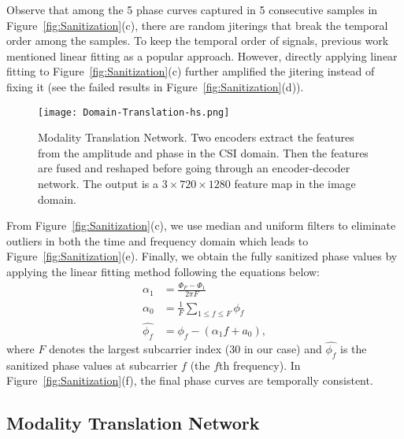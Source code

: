 \documentclass[sigconf, anonymous=false]{acmart}
\newcommand{\dong}[1]{\textcolor{green}{[Dong: #1]}}
\begin{document}
Observe that among the 5 phase curves captured in 5 consecutive samples in Figure~\ref{fig:Sanitization}(c), there are random jiterings that break the temporal order among the samples. To keep the temporal order of signals, previous work \cite{phase_sanitized} mentioned linear fitting as a popular approach. However, directly applying linear fitting to Figure~\ref{fig:Sanitization}(c) further amplified the jitering instead of fixing it (see the failed results in Figure~\ref{fig:Sanitization}(d)). 

\begin{figure*}[!htb]
\centering
\texttt{[image: Domain-Translation-hs.png]}
\caption{Modality Translation Network. Two encoders extract the features from the amplitude and phase in the CSI domain. Then the features are fused and reshaped before going through an encoder-decoder network. The output is a $3 \times 720 \times 1280$ feature map in the image domain.} 
\label{fig:ModalityTranslation}
\end{figure*}

From Figure~\ref{fig:Sanitization}(c), we use median and uniform filters to eliminate outliers in both the time and frequency domain 
which leads to Figure~\ref{fig:Sanitization}(e). Finally, we obtain the fully sanitized phase values by applying the linear fitting method following the equations below:
\begin{equation}
\begin{aligned}
\alpha_1 &= \frac{\Phi_F - \Phi_1}{2\pi F}\\
\alpha_0 &= \frac{1}{F} \sum_{1\leq f \leq F} \phi_f\\
\hat{\phi_f} &= \phi_f - (\alpha_1 f + a_0),
\end{aligned}
\end{equation}
where $F$ denotes the largest subcarrier index (30 in our case) and $\hat{\phi_f}$ is the sanitized phase values at subcarrier $f$ (the $f$th frequency). In Figure~\ref{fig:Sanitization}(f), the final phase curves are temporally consistent.

 \subsection{Modality Translation Network}
\end{document}
